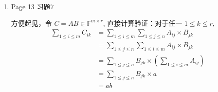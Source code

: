\documentclass{article}
\begin{document}
\begin{spacing}{1.5}
\begin{enumerate}
\begin{spacing}{1.5}
    \end{spacing}

    \begin{itemize}
        \item [-] 若 $A-k^2\alpha\alpha^\top$ 是正定矩阵，那么 $\left[\begin{array}{cc}A&k\alpha\\k\alpha^\top&1\\\end{array}\right]$ 正定。因为：
        \begin{itemize}
            \item [--] 一方面 $f(x^\prime)\geq 0$ 恒成立;
            \item [--] 另一方面, $f(x^\prime)=0$ 可以推出 $x=0, y=0, x^\prime=0$.
        \end{itemize}
        \item [-] 若 $A-k^2\alpha\alpha^\top$ 是半正定矩阵，那么 $\left[\begin{array}{cc}A&k\alpha\\k\alpha^\top&1\\\end{array}\right]$ 半正定。因为：
        \begin{itemize}
            \item [--] 一方面 $f(x^\prime)\geq 0$ 恒成立;
            \item [--] 另一方面, 由于存在$x\ne 0$ 使得 $x^\top (A-k^2\alpha\alpha^\top)x =0$, 取 $y=-k(x^\top\alpha)$ 即得到非零的 $x^\prime$ 使得 $f(x^\prime)=0$.
        \end{itemize}
        \item [-] 若 $A-k^2\alpha\alpha^\top$ 是不定矩阵，那么 $\left[\begin{array}{cc}A&k\alpha\\k\alpha^\top&1\\\end{array}\right]$ 也是不定的。因为：
        此时 $A-k^2\alpha\alpha^\top$ 存在小于 $0$ 的特征值，取 $x$ 为其对应的特征向量，取 $y=-k(x^\top\alpha)$ 即构造得到 $x^\prime$, $f(x^\prime) < 0$.
    \end{itemize}


    \item Page 13 习题7
    
    方便起见，令 $C=AB\in\mathbb{F}^{m\times r}$, 直接计算验证：对于任一 $1\leq k\leq r$,
    \begin{equation*}
        \begin{array}{ll}
            \sum_{1\leq i\leq m} C_{ik} & = \sum_{1\leq i\leq m} \sum_{1\leq j\leq n} A_{ij}\times B_{jk} \\
            & = \sum_{1\leq j\leq n} \sum_{1\leq i\leq m} A_{ij}\times B_{jk} \\
            & = \sum_{1\leq j\leq n} B_{jk}\times\left(\sum_{1\leq i\leq m} A_{ij}\right) \\
            & = \sum_{1\leq j\leq n} B_{jk} \times a \\ 
            & = ab
        \end{array}
    \end{equation*}


\end{enumerate}
\end{spacing}
\end{document}
